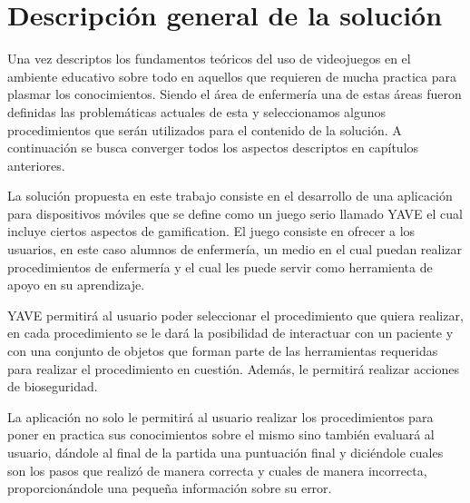 \section{Descripción general de la solución}

Una vez descriptos los fundamentos teóricos del uso de videojuegos en el ambiente educativo sobre todo en aquellos que requieren de mucha practica para plasmar los conocimientos. Siendo el área de enfermería una de estas áreas fueron definidas las problemáticas actuales de esta y seleccionamos algunos procedimientos que serán utilizados 
para el contenido de la solución. A continuación se busca converger todos los aspectos descriptos en
capítulos anteriores.

La solución propuesta en este trabajo consiste en el desarrollo de una aplicación para dispositivos móviles que se define como un juego serio llamado YAVE el cual incluye ciertos aspectos de gamification. El juego consiste en ofrecer a los usuarios, en este caso alumnos de enfermería, un medio en el cual puedan realizar procedimientos de enfermería y el cual les puede servir como herramienta de apoyo en su aprendizaje.

YAVE permitirá al usuario poder seleccionar el procedimiento que quiera realizar, en cada procedimiento se le dará la posibilidad de interactuar con un paciente y con una conjunto de objetos que forman parte de las herramientas requeridas para realizar el procedimiento en cuestión. Además, le permitirá realizar acciones de bioseguridad.

La aplicación no solo le permitirá al usuario realizar los procedimientos para poner en practica sus conocimientos sobre el mismo sino también evaluará al usuario, dándole al final de la partida una puntuación final y diciéndole cuales son los pasos que realizó de manera correcta y cuales de manera incorrecta, proporcionándole una pequeña información sobre su error.